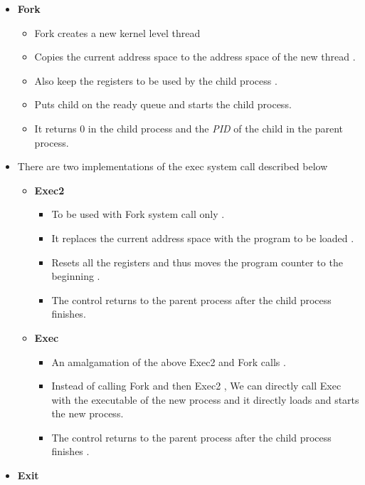 \documentclass{article}
\begin{document}
\begin{itemize}
\begin{itemize}
    \begin{itemize}
    \item
      \textbf{Fork}

      \begin{itemize}
      \item
        Fork creates a new kernel level thread
      \item
        Copies the current address space to the address space of the new
        thread .
      \item
        Also keep the registers to be used by the child process .
      \item
        Puts child on the ready queue and starts the child process.
      \item
        It returns 0 in the child process and the \emph{PID} of the
        child in the parent process.
      \end{itemize}
    \item
      There are two implementations of the exec system call described
      below

      \begin{itemize}
      \item
        \textbf{Exec2}

        \begin{itemize}
        \item
          To be used with Fork system call only .
        \item
          It replaces the current address space with the program to be
          loaded .
        \item
          Resets all the registers and thus moves the program counter to
          the beginning .
        \item
          The control returns to the parent process after the child
          process finishes.
        \end{itemize}
      \item
        \textbf{Exec}

        \begin{itemize}
        \item
          An amalgamation of the above Exec2 and Fork calls .
        \item
          Instead of calling Fork and then Exec2 , We can directly call
          Exec with the executable of the new process and it directly
          loads and starts the new process.
        \item
          The control returns to the parent process after the child
          process finishes .
        \end{itemize}
      \end{itemize}
    \item
      \textbf{Exit}


\end{itemize}
\end{itemize}
\end{itemize}
\end{document}
